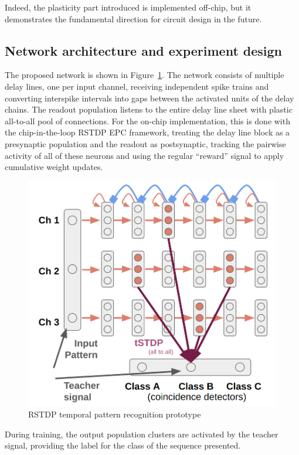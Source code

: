 Indeed, the plasticity part introduced is implemented off-chip, but it demonstrates the fundamental direction for circuit design in the future.


\subsection{Network architecture and experiment design}

The proposed network is shown in Figure~\ref{fig:RSTDP_temporal_recognition_prototype}. The network consists of multiple delay lines, one per input channel, receiving independent spike trains and converting interspike intervals into gaps between the activated units of the delay chains. The readout population listens to the entire delay line sheet with plastic all-to-all pool of connections. For the on-chip implementation, this is done with the chip-in-the-loop RSTDP EPC framework, treating the delay line block as a presynaptic population and the readout as postsynaptic, tracking the pairwise activity of all of these neurons and using the regular ``reward'' signal to apply cumulative weight updates.


\begin{figure}[h]
  \centering
    \includegraphics[width=.8\linewidth]{img/chapter5/RLSTDP_temporal_recognition_prototype.png}
    \caption[RSTDP temporal pattern recognition prototype]{RSTDP temporal pattern recognition prototype}
  \label{fig:RSTDP_temporal_recognition_prototype}
\end{figure}

During training, the output population clusters are activated by the teacher signal, providing the label for the class of the sequence presented.

